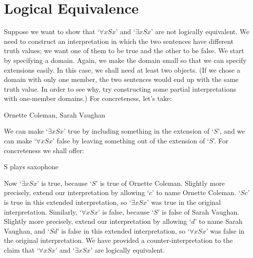 \section{Logical Equivalence}
Suppose we want to show that `$\forall x Sx$' and `$\exists x Sx$' are not logically equivalent. We need to construct an interpretation in which the two sentences have different truth values; we want one of them to be true and the other to be false. We start by specifying a domain. Again, we make the domain small so that we can specify extensions easily. In this case, we shall need at least two objects. (If we chose a domain with only one member, the two sentences would end up with the same truth value. In order to see why, try constructing some partial interpretations with one-member domains.) For concreteness, let's take:
	\begin{ekey}
		\item[\text{domain}] Ornette Coleman, Sarah Vaughan
	\end{ekey}
We can make `$\exists x Sx$' true by including something in the extension of `$S$', and we can make `$\forall x Sx$' false by leaving something out of the extension of `$S$'. For concreteness we shall offer:
	\begin{ekey}
		\item[S]  plays saxophone
	\end{ekey}
Now `$\exists x Sx$' is true, because `$S$' is true of Ornette Coleman. Slightly more precisely, extend our interpretation by allowing `$c$' to name Ornette Coleman.  `$Sc$' is true in this extended interpretation, so `$\exists x Sx$' was true in the original interpretation. Similarly, `$\forall x Sx$' is false, because `$S$' is false of Sarah Vaughan. Slightly more precisely, extend our interpretation by allowing `$d$' to name Sarah Vaughan, and `$Sd$' is false in this extended interpretation, so `$\forall x Sx$' was false in the original interpretation. We have provided a counter-interpretation to the claim that `$\forall x Sx$' and `$\exists x Sx$' are logically equivalent.

